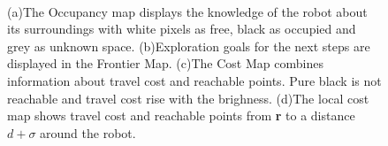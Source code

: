 \documentclass[twocolumn]{svjour3}[2016]
\begin{document}
\begin{figure}
\centering
  \mbox{
  }
    \mbox{
    }
  \caption{(a)The Occupancy map displays the knowledge of the robot about its surroundings with white pixels as free, black as occupied and grey as unknown space. (b)Exploration goals for the next steps are displayed in the Frontier Map. (c)The Cost Map combines information about travel cost and reachable points. Pure black is not reachable and travel cost rise with the brighness. (d)The local cost map shows travel cost and reachable points from \textbf{r} to a distance $d + \sigma$ around the robot. }
  \label{typical_map_representations}       %
\end{figure}
\end{document}
